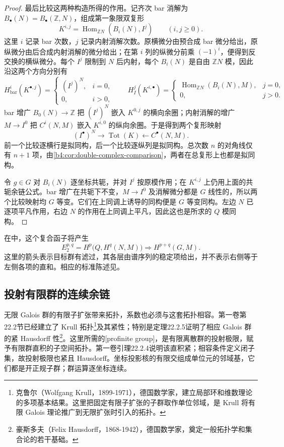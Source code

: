 \begin{proof}
	最后比较这两种构造所得的作用。记齐次 bar 消解为 \(B_\bullet(N)=B_\bullet(\mathbb Z,N)\)，组成第一象限双复形
	\[
		K^{i,j}=\operatorname{Hom}_{\mathbb ZN}(B_i(N),I^j) \qquad(i,j\ge0).
	\]
	这里 \(i\) 记录 bar 次数，\(j\) 记录内射消解次数。原横微分由预合成 bar 微分给出，原纵微分由后合成内射消解的微分给出；在第 \(i\) 列的纵微分前乘 \((-1)^i\)，便得到反交换的横纵微分。每个 \(I^j\) 限制到 \(N\) 后内射，每个 \(B_i(N)\) 是自由 \(\mathbb ZN\) 模，因此沿这两个方向分别有
	\[
		H_{\mathrm{bar}}^i(K^{\bullet,j})=
		\begin{cases}
			(I^j)^N,&i=0,\\
			0,&i>0,
		\end{cases}
		\qquad H_I^j(K^{i,\bullet})=
		\begin{cases}
			\operatorname{Hom}_{\mathbb ZN}(B_i(N),M),&j=0,\\
			0,&j>0.
		\end{cases}
	\]
	bar 增广 \(B_0(N)\to\mathbb Z\) 把 \((I^j)^N\) 嵌入 \(K^{0,j}\) 的横向余圈；内射消解的增广 \(M\to I^0\) 把 \(C^i(N,M)\) 嵌入 \(K^{i,0}\) 的纵向余圈。于是得到两个复形映射
	\[
		(I^\bullet)^N\longrightarrow\operatorname{Tot}(K) \longleftarrow C^\bullet(N,M).
	\]
	前一个比较逐横行是拟同构，后一个比较逐纵列是拟同构。总次数 \(n\) 的对角线仅有 \(n+1\) 项，由\cref{b4:cor:double-complex-comparison}，两者在总复形上也都是拟同构。

	令 \(g\in G\) 对 \(B_i(N)\) 逐坐标共轭，并对 \(I^j\) 按原模作用；在 \(K^{i,j}\) 上仍用上面的共轭余链公式。bar 增广在共轭下不变，\(M\to I^0\) 及消解微分都是 \(G\) 线性的，所以两个比较映射均 \(G\) 等变。它们在上同调上诱导的同构便是 \(G\) 等变同构。左边 \(N\) 已逐项平凡作用，右边 \(N\) 的作用在上同调上平凡，因此这也是所求的 \(Q\) 模同构。
\end{proof}

在中，这个复合函子将产生
\[
	E_2^{p,q}=H^p\bigl(Q,H^q(N,M)\bigr) \Longrightarrow H^{p+q}(G,M).
\]
这里的箭头表示目标群有滤过，其各层由谱序列的稳定项给出，并不表示右侧等于左侧各项的直和。相应的标准陈述见\cite[Lyndon/Hochschild-Serre Spectral Sequence 6.8.2]{Weibel1994HomologicalAlgebra}。

\subsection{投射有限群的连续余链}
\label{b4:subsec:1104:03}

无限 Galois 群的有限子扩张带来拓扑，系数也必须与这套拓扑相容。第一卷第22.2节已经建立了 Krull 拓扑\footnote{克鲁尔（Wolfgang Krull，1899-1971），德国数学家，建立局部环和维数理论的多项基本结果。这里把固定有限子扩张的子群取作单位邻域，是 Krull 将有限 Galois 理论推广到无限扩张时引入的拓扑。}及其紧性；特别是定理22.2.5证明了相应 Galois 群的紧 Hausdorff 性\footnote{豪斯多夫（Felix Hausdorff，1868-1942），德国数学家，奠定一般拓扑学和集合论的若干基础。}。这里所需的[profinite group]，是有限离散群的投射极限，赋予有限群直积的子空间拓扑。第一卷引理22.2.4说明该直积紧；相容条件定义闭子集，故投射极限也紧且 Hausdorff。坐标投影核的有限交组成单位元的邻域基，它们都是开正规子群；群运算逐坐标连续。

